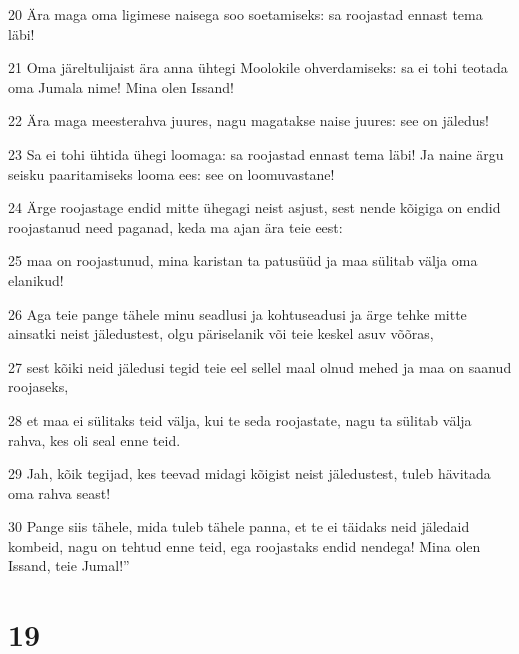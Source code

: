 \par 20 Ära maga oma ligimese naisega soo soetamiseks: sa roojastad ennast tema läbi!
\par 21 Oma järeltulijaist ära anna ühtegi Moolokile ohverdamiseks: sa ei tohi teotada oma Jumala nime! Mina olen Issand!
\par 22 Ära maga meesterahva juures, nagu magatakse naise juures: see on jäledus!
\par 23 Sa ei tohi ühtida ühegi loomaga: sa roojastad ennast tema läbi! Ja naine ärgu seisku paaritamiseks looma ees: see on loomuvastane!
\par 24 Ärge roojastage endid mitte ühegagi neist asjust, sest nende kõigiga on endid roojastanud need paganad, keda ma ajan ära teie eest:
\par 25 maa on roojastunud, mina karistan ta patusüüd ja maa sülitab välja oma elanikud!
\par 26 Aga teie pange tähele minu seadlusi ja kohtuseadusi ja ärge tehke mitte ainsatki neist jäledustest, olgu päriselanik või teie keskel asuv võõras,
\par 27 sest kõiki neid jäledusi tegid teie eel sellel maal olnud mehed ja maa on saanud roojaseks,
\par 28 et maa ei sülitaks teid välja, kui te seda roojastate, nagu ta sülitab välja rahva, kes oli seal enne teid.
\par 29 Jah, kõik tegijad, kes teevad midagi kõigist neist jäledustest, tuleb hävitada oma rahva seast!
\par 30 Pange siis tähele, mida tuleb tähele panna, et te ei täidaks neid jäledaid kombeid, nagu on tehtud enne teid, ega roojastaks endid nendega! Mina olen Issand, teie Jumal!”

\chapter{19}

